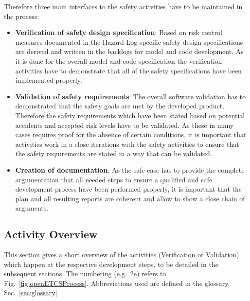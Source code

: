 \documentclass{template/openetcs_report}
\begin{document}
Therefore three main interfaces to the safety activities have to be maintained in the \vv process:
\begin{itemize}
\item \textbf{Verification of safety design specification}: Based on risk control measures documented in the Hazard Log specific safety design specifications are derived and written in the backlogs for model and code development. As it is done for the overall model and code specification the verification activities have to demonstrate that all of the safety specifications have been implemented properly.
\item \textbf{Validation of safety requirements}: The overall software validation has to demonstrated that the safety goals are met by the developed product. Therefore the safety requirements which have been stated based on potential accidents and accepted risk levels have to be validated. As these in many cases requires proof for the absence of certain conditions, it is important that \vv activities work in a close iterations with the safety activities to ensure that the safety requirements are stated in a way that can be validated. 
\item \textbf{Creation of \vv documentation}: As the safe case has to provide the complete argumentation that all needed steps to ensure a qualified and safe development process have been performed properly, it is important that the \vv plan and all resulting \vv reports are coherent and allow to show a close chain of arguments. 
\end{itemize}



\subsection{\VV Activity Overview}
\label{sec:vv-activ-overv}

This section gives a short overview of the activities (Verification or Validation) which
happen at the respective development steps, to be detailed in the
subsequent sections. The numbering (e.g.\ 2e) refers to
Fig.~\ref{fig:openETCSProcess}. Abbreviations used are defined in the glossary, Sec.~\ref{sec:glossary}.
\end{document}
